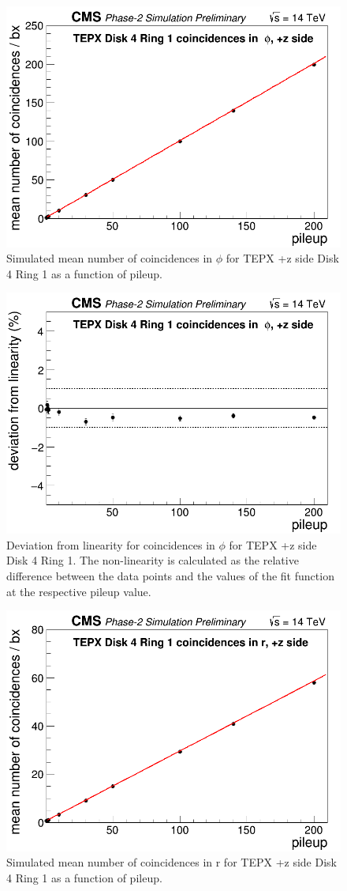 \begin{figure}[H]
  \centering
  \includegraphics[width=0.5\columnwidth]{./TEPX_Disk_4_Ring_1_coincidences_in_phi__pz_side_mean_number_of_coincidences___bx_Linearity.png}
  \caption{Simulated mean number of coincidences in $\phi$ for TEPX +z side Disk 4 Ring 1 as a function of pileup.}
  \label{fig:CMS}
\end{figure}


\begin{figure}[H]
  \centering
  \includegraphics[width=0.5\columnwidth]{./TEPX_Disk_4_Ring_1_coincidences_in_phi__pz_side_mean_number_of_coincidences___bx_Linearity_residuals.png}
  \caption{Deviation from linearity for coincidences in $\phi$ for TEPX +z side Disk 4 Ring 1. The non-linearity is calculated as the relative difference between the data points and the values of the fit function at the respective pileup value.}
  \label{fig:CMS}
\end{figure}



\begin{figure}[H]
  \centering
  \includegraphics[width=0.5\columnwidth]{./TEPX_Disk_4_Ring_1_coincidences_in_r__pz_side_mean_number_of_coincidences___bx_Linearity.png}
  \caption{Simulated mean number of coincidences in r for TEPX +z side Disk 4 Ring 1 as a function of pileup.}
  \label{fig:CMS}
\end{figure}



